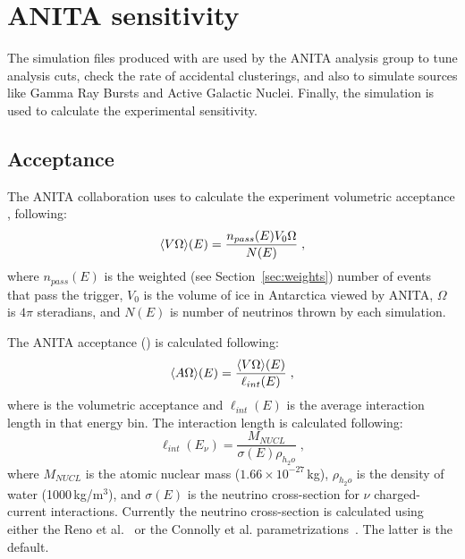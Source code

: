 \section{ANITA sensitivity}
\label{sec:results}

The simulation files produced with \icemc are used by the ANITA analysis group to tune analysis cuts, check the rate of accidental clusterings, and also to simulate sources like Gamma Ray Bursts and Active Galactic Nuclei.
Finally, the simulation is used to calculate the experimental sensitivity.

\subsection{Acceptance}
\label{subsec:acceptance}
The ANITA collaboration uses \icemc to calculate the experiment volumetric acceptance \effvol, following:
\begin{equation}
  \label{eq:volacceptance}
  \langle V\Omega\rangle(E) = \dfrac{n_{{pass}}(E)V_0\Omega}{N(E)} \;,
\end{equation}
\noindent where
 $n_{{pass}}(E)$ is the weighted (see Section~\ref{sec:weights}) number of events that pass the trigger,
 $V_0$ is the volume of ice in Antarctica viewed by ANITA,
$\Omega$ is $4\pi$ steradians, and 
 $N(E)$ is number of neutrinos thrown by each simulation.

The ANITA acceptance (\effarea) is calculated following:
\begin{equation}
  \label{eq:acceptance}
  \langle A\Omega\rangle(E) = \dfrac{\langle V\Omega\rangle(E)}{\ell_{{int}}(E)} \;,
\end{equation}
\noindent where
 \effvol is the volumetric acceptance and
 $\ell_{{int}}(E)$ is the average interaction length in that energy bin. %
The interaction length is calculated following:
 \begin{equation}
   \label{eq:intlength}
    \ell_{{int}}(E_\nu) =   \dfrac{M_{NUCL}}{\sigma(E) \rho_{h_2o} } \;,
  \end{equation}
\noindent where
 $M_{NUCL}$ is the atomic nuclear mass ($1.66\times 10^{-27}$\,kg),
 $\rho_{h_2o}$ is the density of water (1000\,kg/m$^3$), 
and $\sigma(E)$ is the neutrino cross-section for $\nu$ charged-current interactions.
Currently the neutrino cross-section is calculated using either the
Reno et al.~\cite{reno2005high}
or the Connolly et al. parametrizations~\cite{PhysRevD.83.113009}.
The latter is the default.

